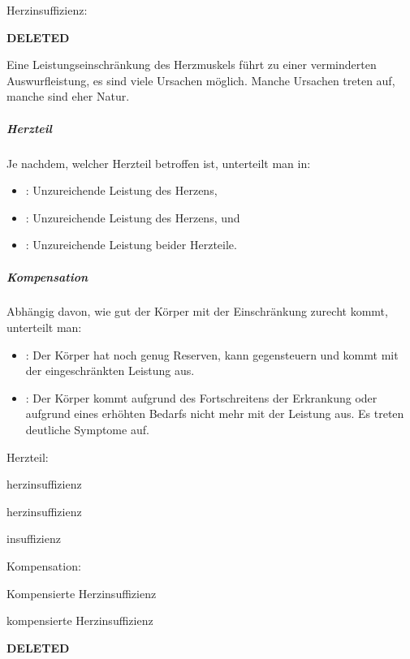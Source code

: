 \documentclass[
ngerman,
paper=a4,
asymmetric,
fontsize=10pt,
headings=small,
draft=false,
numbers=noenddot,
bibtotocnumbered,
footnotes=multiple,
]{scrreprt}
\newcommand{\jALT}{{\color{red}\sffamily\textbf{DELETED}\hrulefill\newline\newline}}
\begin{document}
\begin{enumerate}
\item Herzinsuffizienz:

\jALT
{}

Eine Leistungseinschränkung des Herzmuskels führt zu einer
verminderten Auswurfleistung, es sind viele Ursachen
möglich. Manche Ursachen treten  auf, manche sind
 eher  Natur.
 
 
 
{
\subparagraph{Herzteil} 
Je nachdem, welcher Herzteil betroffen ist, unterteilt man in:

 \begin{itemize}
   \item {}: Unzureichende Leistung des 
   Herzens,
   \item {}:
   Unzureichende Leistung des  Herzens, und
   \item {}: Unzureichende Leistung beider Herzteile.
 \end{itemize}

\subparagraph{Kompensation}
Abhängig davon, wie gut der Körper mit der
 Einschränkung zurecht kommt, unterteilt man:
 \begin{itemize}
   \item {}: Der Körper hat noch
   genug Reserven, kann gegensteuern und kommt mit der
   eingeschränkten Leistung aus.
   \item {}:
   Der Körper kommt aufgrund des Fortschreitens der
   Erkrankung oder aufgrund eines erhöhten Bedarfs nicht mehr
   mit der Leistung aus. Es treten deutliche
   Symptome auf.
 \end{itemize}
 }{
 \begin{compactitem}
   \item Herzteil:
   \begin{compactitem}
     \item {}herzinsuffizienz
     \item {}herzinsuffizienz
     \item {}insuffizienz
   \end{compactitem}
   \item Kompensation:
   \begin{compactitem}
     \item Kompensierte Herzinsuffizienz
     \item {}kompensierte Herzinsuffizienz
   \end{compactitem}
 \end{compactitem}
 }{}{}{}
\jALT


\end{enumerate}
\end{document}
